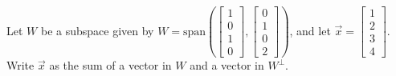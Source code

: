 \documentclass{ximera}
\begin{document}
\begin{example}\label{ex:OrthogDecomp}
Let $W$ be a subspace given by $W = \mbox{span}\left(\begin{bmatrix}
  1 \\ 0 \\ 1 \\ 0
  \end{bmatrix},
  \begin{bmatrix}
  0 \\ 1 \\ 0 \\ 2
\end{bmatrix}\right)$, and let $\vec{x}=\begin{bmatrix}
  1 \\ 2 \\ 3 \\ 4
  \end{bmatrix}$.  Write $\vec{x}$ as the sum of a vector in $W$ and a vector in $W^\perp$.
  

\end{example}
\end{document}
